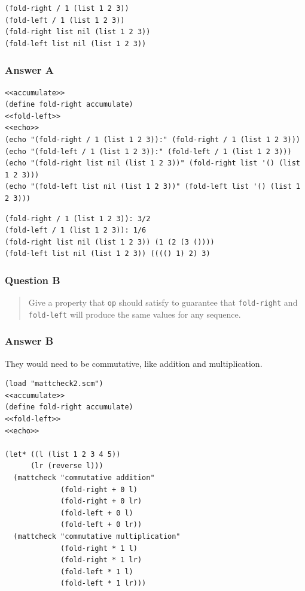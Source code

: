 \documentclass[final,fleqn,titlepage,twoside]{article}
\begin{document}
\begin{verbatim}
(fold-right / 1 (list 1 2 3))
(fold-left / 1 (list 1 2 3))
(fold-right list nil (list 1 2 3))
(fold-left list nil (list 1 2 3))
\end{verbatim}

\subsubsection{Answer A}
\label{sec:org0c99b85}
\begin{verbatim}
<<accumulate>>
(define fold-right accumulate)
<<fold-left>>
<<echo>>
(echo "(fold-right / 1 (list 1 2 3)):" (fold-right / 1 (list 1 2 3)))
(echo "(fold-left / 1 (list 1 2 3)):" (fold-left / 1 (list 1 2 3)))
(echo "(fold-right list nil (list 1 2 3))" (fold-right list '() (list 1 2 3)))
(echo "(fold-left list nil (list 1 2 3))" (fold-left list '() (list 1 2 3)))
\end{verbatim}

\begin{verbatim}
(fold-right / 1 (list 1 2 3)): 3/2 
(fold-left / 1 (list 1 2 3)): 1/6 
(fold-right list nil (list 1 2 3)) (1 (2 (3 ()))) 
(fold-left list nil (list 1 2 3)) (((() 1) 2) 3) 
\end{verbatim}

\subsubsection{Question B}
\label{sec:orgd9e86be}
\begin{quote}
Give a property that \texttt{op} should satisfy to guarantee that
\texttt{fold-right} and \texttt{fold-left} will produce the same values
for any sequence.
\end{quote}

\subsubsection{Answer B}
\label{sec:org14c4c98}
They would need to be commutative, like addition and multiplication.

\begin{verbatim}
(load "mattcheck2.scm")
<<accumulate>>
(define fold-right accumulate)
<<fold-left>>
<<echo>>

(let* ((l (list 1 2 3 4 5))
      (lr (reverse l)))
  (mattcheck "commutative addition"
             (fold-right + 0 l)
             (fold-right + 0 lr)
             (fold-left + 0 l)
             (fold-left + 0 lr))
  (mattcheck "commutative multiplication"
             (fold-right * 1 l)
             (fold-right * 1 lr)
             (fold-left * 1 l)
             (fold-left * 1 lr)))
\end{verbatim}
\end{document}
